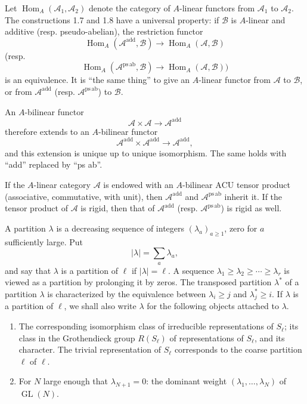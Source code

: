 \documentclass[11pt]{article}
\newcommand{\Hom}{\operatorname{Hom}}
\newcommand{\GL}{\operatorname{GL}}
\newcommand{\ACU}{\mathrm{ACU}}
\newcommand{\psab}{\mathrm{ps\,ab}}
\newcommand{\add}{\mathrm{add}}
\theoremstyle{deligne}
\newcommand{\para}[1]{\vspace{0.65em}\noindent{\bfseries #1}\quad}
\begin{document}
\para{1.9.}
Let \(\Hom_A(\mathcal A_1,\mathcal A_2)\) denote the category of \(A\)-linear functors from \(\mathcal A_1\) to \(\mathcal A_2\). The constructions 1.7 and 1.8 have a universal property: if \(\mathcal B\) is \(A\)-linear and additive (resp. pseudo-abelian), the restriction functor
\[
  \Hom_A(\mathcal A^{\add},\mathcal B)\longrightarrow\Hom_A(\mathcal A,\mathcal B)
\]
(resp.
\[
  \Hom_A(\mathcal A^{\psab},\mathcal B)\longrightarrow\Hom_A(\mathcal A,\mathcal B))
\]
is an equivalence. It is ``the same thing'' to give an \(A\)-linear functor from \(\mathcal A\) to \(\mathcal B\), or from \(\mathcal A^{\add}\) (resp. \(\mathcal A^{\psab}\)) to \(\mathcal B\).

An \(A\)-bilinear functor
\[
  \mathcal A\times\mathcal A\longrightarrow \mathcal A^{\add}
\]
therefore extends to an \(A\)-bilinear functor
\[
  \mathcal A^{\add}\times\mathcal A^{\add}\longrightarrow \mathcal A^{\add},
\]
and this extension is unique up to unique isomorphism. The same holds with ``add'' replaced by ``ps ab''.

If the \(A\)-linear category \(\mathcal A\) is endowed with an \(A\)-bilinear \(\ACU\) tensor product (associative, commutative, with unit), then \(\mathcal A^{\add}\) and \(\mathcal A^{\psab}\) inherit it. If the tensor product of \(\mathcal A\) is rigid, then that of \(\mathcal A^{\add}\) (resp. \(\mathcal A^{\psab}\)) is rigid as well.

\para{1.10.}
A partition \(\lambda\) is a decreasing sequence of integers \((\lambda_a)_{a\ge1}\), zero for \(a\) sufficiently large. Put
\[
  |\lambda|=\sum_a \lambda_a,
\]
and say that \(\lambda\) is a partition of \(\ell\) if \(|\lambda|=\ell\). A sequence \(\lambda_1\ge\lambda_2\ge\cdots\ge\lambda_r\) is viewed as a partition by prolonging it by zeros. The transposed partition \(\lambda^*\) of a partition \(\lambda\) is characterized by the equivalence between \(\lambda_i\ge j\) and \(\lambda^*_j\ge i\). If \(\lambda\) is a partition of \(\ell\), we shall also write \(\lambda\) for the following objects attached to \(\lambda\).

\begin{enumerate}[label=(\Alph*)]
\item The corresponding isomorphism class of irreducible representations of \(S_\ell\); its class in the Grothendieck group \(R(S_\ell)\) of representations of \(S_\ell\), and its character. The trivial representation of \(S_\ell\) corresponds to the coarse partition \(\ell\) of \(\ell\).
\item For \(N\) large enough that \(\lambda_{N+1}=0\): the dominant weight \((\lambda_1,\ldots,\lambda_N)\) of \(\GL(N)\).
\end{enumerate}
\end{document}
